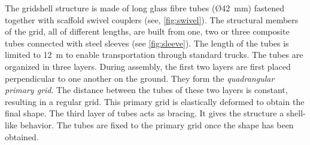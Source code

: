 
The gridshell structure is made of long glass fibre tubes (\O 42~mm) fastened together with scaffold swivel couplers (see, \cref{fig:swivel}). The structural members of the grid, all of different lengths, are built  from one, two or three composite tubes connected with steel sleeves (see \cref{fig:sleeve}). The length of the tubes is limited to 12~m to enable transportation through standard trucks. The tubes are organized in three layers. During assembly, the first two layers are first placed perpendicular to one another on the ground. They form the \emph{quadrangular primary grid}. The distance between the tubes of these two layers is constant, resulting in a regular grid. This primary grid is elastically deformed to obtain the final shape. The third layer of tubes acts as bracing. It gives the structure a shell-like behavior. The tubes are fixed to the primary grid once the shape has been obtained.

